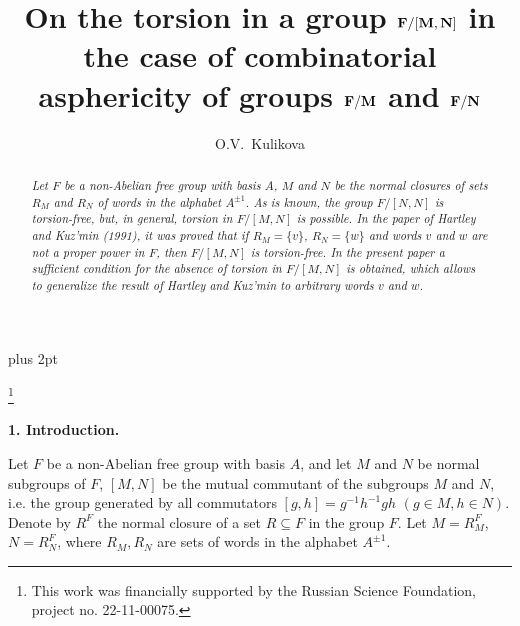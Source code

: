 \documentclass[12pt,reqno]{amsart}
\begin{document}
 plus 2pt %


\title[
]{On the torsion in a group $\bf F/[M,N]$ in the case of combinatorial asphericity of groups $\bf F/M$ and $\bf F/N$}

\author[]{O.V.~Kulikova}


\address{\newline O.V.Kulikova \newline Lomonosov Moscow State University, \newline Moscow Center for Fundamental and Applied Mathematics \newline (Moscow, Russia)}


\dedicatory{}  \thanks{This work was financially supported by the Russian Science Foundation, project no. 22-11-00075.
}


\begin{abstract} {\it Let $F$ be a non-Abelian free group with basis $A$, $M$ and $N$ be the normal closures of sets $R_M$ and $R_N$ of words in the alphabet $A^{\pm 1}$.
As is known, the group $F/[N, N]$ is torsion-free, but, in general,  torsion in $F/[M, N]$ is possible.
  In the paper of Hartley and Kuz'min (1991), it was proved that
  if $R_M=\{v\}$, $R_N=\{w\}$ and words $v$ and $w$ are not a proper power in $F$, then  $F/[M,N]$ is torsion-free.
  In the present paper a sufficient condition for the absence of torsion in $F/[M,N]$ is obtained, which allows to generalize the result of Hartley and Kuz'min to arbitrary words $v$ and $w$. }
\end{abstract}




\maketitle 

 \setcounter{tocdepth}{2}
\def\st{{\sf st}}

\setcounter{section}{-1}

{\bf 1. Introduction.}

Let $F$ be a non-Abelian free group with basis $A$, and let $M$ and $N$ be normal subgroups of $F$, $[M,N]$ be the mutual commutant of the subgroups $M$ and $N$, i.e. the group generated by all commutators $[g, h]=g^{-1}h^{-1}gh\,\, (g\in M, h\in N)$. Denote by $R^F$ the normal closure of a set $R\subseteq F$ in the group $F$.
 Let $M=R_M^F$, $N=R_N^F$, where $R_M, R_N$ are sets of words in the alphabet $A^{\pm 1}$.
\end{document}
